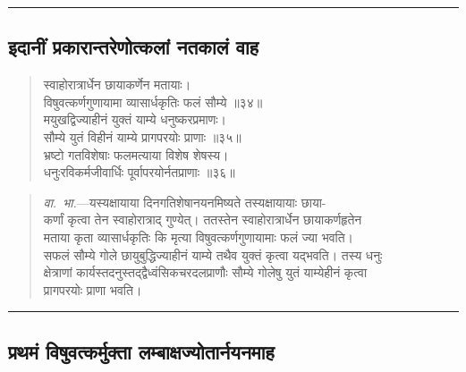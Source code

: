 \documentclass[11pt,a4paper]{article}
\newcommand{\longline}{\noindent\rule{\textwidth}{0.4pt}}
\newcommand{\dev}[1]{{\devanagarifont #1}}
\newenvironment{shloka}{%
  \begin{quote}
  \small
  \setlength{\leftmargin}{2em}
  \devanagarifont
}{\end{quote}}
\newenvironment{vyakhya}{%
  \begin{quote}
  \small
  \setlength{\leftmargin}{1em}
  \devanagarifont
}{\end{quote}}
\newcommand{\skt}[1]{{\devanagarifont #1}}
\begin{document}
\longline

\subsection{\dev{इदानीं प्रकारान्तरेणोत्कलां नतकालं वाह}}

\begin{shloka}
\skt{स्वाहोरात्रार्धेन छायाकर्णेन मतायाः।}\\
\skt{विषुवत्कर्णगुणायामा व्यासार्धकृतिः फलं सौम्ये ॥३४॥}\\[0.3em]
\skt{मयुखद्विज्याहीनं युक्तं याम्ये धनुष्करप्रमाणः।}\\
\skt{सौम्ये युतं विहीनं याम्ये प्रागपरयोः प्राणाः ॥३५॥}\\[0.3em]
\skt{भ्रष्टो गतविशेषाः फलमत्याया विशेष शेषस्य।}\\
\skt{धनुःरविकर्मजीवार्धिः पूर्वापरयोर्नतप्राणाः ॥३६॥}
\end{shloka}

\begin{vyakhya}
\textit{वा.\ भा.}—\skt{यस्यक्षायाया दिनगतिशेषानयनमिष्यते तस्यक्षायायाः छाया-}\\
\skt{कर्णां कृत्वा तेन स्वाहोरात्राद्‌ गुण्येत्। ततस्तेन स्वाहोरात्रार्धेन छायाकर्णहृतेन}\\
\skt{मताया कृता व्यासार्धकृतिः कि मृत्या विषुवत्कर्णगुणायामाः फलं ज्या भवति।}\\
\skt{सफलं सौम्ये गोले छायुबुद्धिज्याहीनं याम्ये तथैव युक्तं कृत्वा यद्‌भवति। तस्य धनुः}\\
\skt{क्षेत्राणां कार्यस्तदनुस्तद्द्वैध्वंसिकचरदलप्राणौः सौम्ये गोलेषु युतं याम्येहीनं कृत्वा}\\
\skt{प्रागपरयोः प्राणा भवति।}
\end{vyakhya}

\longline

\subsection{\dev{प्रथमं विषुवत्कर्मुक्ता लम्बाक्षज्योतार्नयनमाह}}
\end{document}
